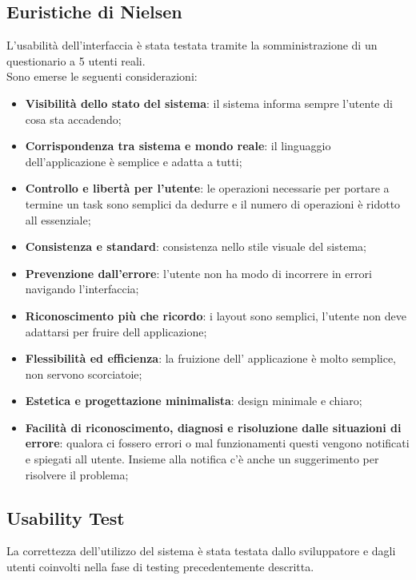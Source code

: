 \documentclass{report}
\begin{document}
\subsection{Euristiche di Nielsen}
L'usabilità dell'interfaccia è stata testata tramite la somministrazione di un questionario a 5 utenti reali.\\
Sono emerse le seguenti considerazioni:
\begin{itemize}
    \item \textbf{Visibilità dello stato del sistema}: il sistema informa sempre l'utente di cosa sta accadendo;
    \item \textbf{Corrispondenza tra sistema e mondo reale}: il linguaggio dell'applicazione è semplice e adatta a tutti;
    \item  \textbf{Controllo e libertà per l’utente}: le operazioni necessarie per portare a termine un task sono semplici da dedurre e il numero di operazioni è ridotto all essenziale;
    \item \textbf{Consistenza e standard}: consistenza nello stile visuale del sistema;
    \item \textbf{Prevenzione dall’errore}: l'utente non ha modo di incorrere in errori navigando l'interfaccia;
    \item \textbf{Riconoscimento più che ricordo}: i layout sono semplici, l'utente non deve adattarsi per fruire dell applicazione;
    \item  \textbf{Flessibilità ed efficienza}: la fruizione dell' applicazione è molto semplice, non servono scorciatoie;
    \item \textbf{Estetica e progettazione minimalista}: design minimale e chiaro;
    \item \textbf{Facilità di riconoscimento, diagnosi e risoluzione dalle situazioni di errore}: qualora ci fossero errori o mal funzionamenti questi vengono notificati e spiegati all utente. Insieme alla notifica c'è anche un suggerimento per risolvere il problema;
\end{itemize}
\subsection{Usability Test}
La correttezza dell'utilizzo del sistema è stata testata dallo sviluppatore e dagli utenti coinvolti nella fase di testing precedentemente descritta.
\end{document}
